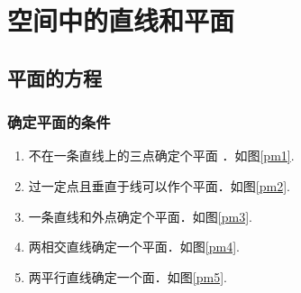 \chapter{空间中的直线和平面}
\section{平面的方程}
\subsection{确定平面的条件}
\thispagestyle{empty}
\begin{enumerate}[$\bullet$]
	\setlength{\itemindent}{3em}
	\setlength{\topsep}{0.01em}
	\setlength{\itemsep}{0.01em}
	\item 不在一条直线上的三点确定个平面 ．如图\ref{pm1}.
	\item 过一定点且垂直于线可以作个平面．如图\ref{pm2}.
	\item 一条直线和外点确定个平面．如图\ref{pm3}.
	\item 两相交直线确定一个平面．如图\ref{pm4}.
	\item 两平行直线确定一个面．如图\ref{pm5}.
\end{enumerate}
